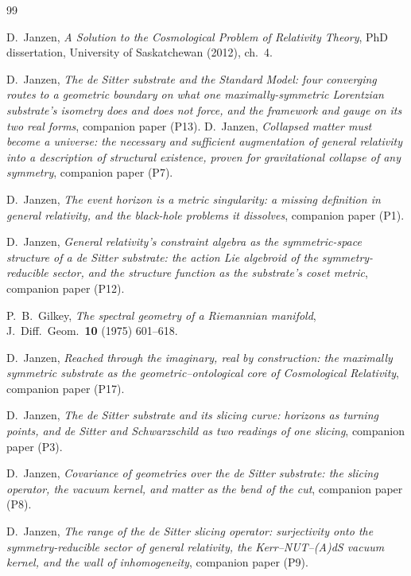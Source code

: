 \documentclass[11pt,a4paper]{article}
\theoremstyle{plain}
\theoremstyle{definition}
\theoremstyle{remark}
\begin{document}
\begin{thebibliography}{99}

 D.~Janzen, \emph{A Solution to the Cosmological Problem of Relativity Theory}, PhD dissertation, University of Saskatchewan (2012), ch.~4.

 D.~Janzen, \emph{The de Sitter substrate and the Standard Model: four converging routes to a geometric boundary on what one maximally-symmetric Lorentzian substrate's isometry does and does not force, and the framework and gauge on its two real forms}, companion paper (P13).
 D.~Janzen, \emph{Collapsed matter must become a universe: the necessary and sufficient augmentation of general relativity into a description of structural existence, proven for gravitational collapse of any symmetry}, companion paper (P7).

D.~Janzen,
\emph{The event horizon is a metric singularity: a missing definition in general relativity, and the black-hole problems it dissolves}, companion paper (P1).

D.~Janzen,
\emph{General relativity's constraint algebra as the symmetric-space structure of a de Sitter substrate: the action Lie algebroid of the symmetry-reducible sector, and the structure function as the substrate's coset metric}, companion paper (P12).

P.~B.~Gilkey,
\emph{The spectral geometry of a Riemannian manifold},
J.~Diff.~Geom.~\textbf{10} (1975) 601--618.

D.~Janzen,
\emph{Reached through the imaginary, real by construction: the maximally symmetric substrate as the geometric--ontological core of Cosmological Relativity}, companion paper (P17).

D.~Janzen,
\emph{The de Sitter substrate and its slicing curve: horizons as turning points, and de Sitter and Schwarzschild as two readings of one slicing}, companion paper (P3).

D.~Janzen,
\emph{Covariance of geometries over the de Sitter substrate: the slicing operator, the vacuum kernel, and matter as the bend of the cut}, companion paper (P8).

D.~Janzen,
\emph{The range of the de Sitter slicing operator: surjectivity onto the symmetry-reducible sector of general relativity, the Kerr--NUT--(A)dS vacuum kernel, and the wall of inhomogeneity}, companion paper (P9).


\end{thebibliography}
\end{document}
